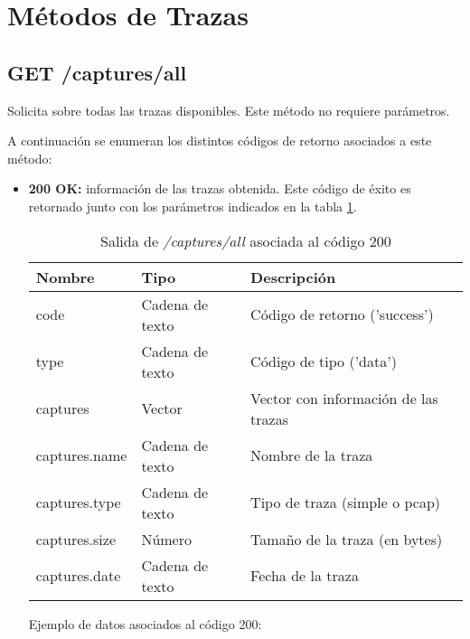 \section{Métodos de Trazas \label{extra:api:trazas}}

%
%
\subsection{GET /captures/all}
Solicita sobre todas las \glspl{traza} disponibles. Este método no requiere parámetros.

A continuación se enumeran los distintos códigos de retorno asociados a este método:
\begin{itemize}

\item{\textbf{200 OK:} información de las \glspl{traza} obtenida. Este código de éxito es retornado junto con los parámetros indicados en la tabla \ref{extra:api:capturesall:ok}.
\begin{table}[H]
\centering
\begin{tabular}{|l|l|l|}
\hline
\rowcolor[HTML]{F5F5F5}
\textbf{Nombre}                & \textbf{Tipo}   & \textbf{Descripción}                            \\ \hline
code                           & Cadena de texto & Código de retorno ('success')                   \\ \hline
type                           & Cadena de texto & Código de tipo ('data')                         \\ \hline
captures                       & Vector          & Vector con información de las \glspl{traza}     \\ \hline
captures.name                  & Cadena de texto & Nombre de la \gls{traza}                        \\ \hline
captures.type                  & Cadena de texto & Tipo de \gls{traza} (\gls{simple} o \gls{pcap}) \\ \hline
captures.size                  & Número          & Tamaño de la \gls{traza} (en bytes)             \\ \hline
captures.date                  & Cadena de texto & Fecha de la \gls{traza}                         \\ \hline
\end{tabular}
\caption{Salida de \textit{/captures/all} asociada al código 200}
\label{extra:api:capturesall:ok}
\end{table}
\begin{minipage}{\textwidth}
Ejemplo de datos asociados al código 200:


\end{minipage}}
\end{itemize}

